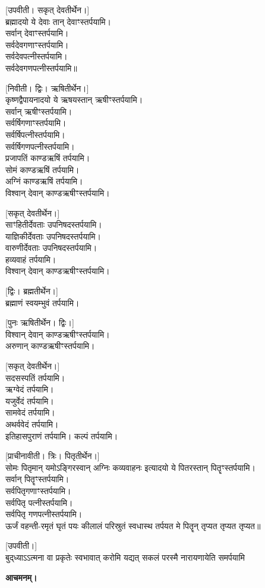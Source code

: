 \vspace{-1ex}
{\scriptsize [उपवीती। सकृत् देवतीर्थेन।]}\\
ब्रह्मादयो ये देवाः तान् देवाꣳस्तर्पयामि।\\
सर्वान् देवाꣳस्तर्पयामि।\\
सर्वदेवगणाꣳस्तर्पयामि।\\
सर्वदेवपत्नीस्तर्पयामि।\\
सर्वदेवगणपत्नीस्तर्पयामि॥

{\scriptsize [निवीती। द्विः। ऋषितीर्थेन।]}\\
कृष्णद्वैपायनादयो ये ऋषयस्तान् ऋषीꣳस्तर्पयामि।\\
सर्वान् ऋषीꣳस्तर्पयामि।\\
सर्वर्षिगणाꣳस्तर्पयामि।\\
सर्वर्षिपत्नीस्तर्पयामि।\\
सर्वर्षिगणपत्नीस्तर्पयामि।\\
प्रजापतिं काण्डऋषिं तर्पयामि।\\
सोमं काण्डऋषिं तर्पयामि।\\
अग्निं काण्डऋषिं तर्पयामि।\\
विश्वान् देवान् काण्डऋषीꣳस्तर्पयामि।
\pagebreak[4]

{\scriptsize [सकृत् देवतीर्थेन।]}\\
साꣳहितीर्देवताः उपनिषदस्तर्पयामि।\\
याज्ञिकीर्देवताः उपनिषदस्तर्पयामि।\\
वारुणीर्देवताः उपनिषदस्तर्पयामि।\\
हव्यवाहं तर्पयामि।\\
विश्वान् देवान् काण्डऋषीꣳस्तर्पयामि।

{\scriptsize [द्विः। ब्रह्मतीर्थेन।]}\\
ब्रह्माणं स्वयम्भुवं तर्पयामि।

{\scriptsize [पुनः ऋषितीर्थेन। द्विः।]}\\
विश्वान् देवान् काण्डऋषीꣳस्तर्पयामि।\\
अरुणान् काण्डऋषीꣳस्तर्पयामि।

{\scriptsize [सकृत् देवतीर्थेन।]}\\
सदसस्पतिं तर्पयामि।\\
ऋग्वेदं तर्पयामि।\\
यजुर्वेदं तर्पयामि।\\
सामवेदं तर्पयामि।\\
अथर्ववेदं तर्पयामि।\\
इतिहासपुराणं तर्पयामि। कल्पं तर्पयामि।

{\scriptsize [प्राचीनावीती। त्रिः। पितृतीर्थेन।]}\\
सोमः पितृमान् यमोऽङ्गिरस्वान् अग्निः कव्यवाहनः इत्यादयो ये पितरस्तान् पितॄꣳस्तर्पयामि।\\
सर्वान् पितॄꣳस्तर्पयामि।\\
सर्वपितृगणाꣳस्तर्पयामि।\\
सर्वपितृ पत्नीस्तर्पयामि।\\
सर्वपितृ गणपत्नीस्तर्पयामि।\\
ऊर्जं वहन्ती-रमृतं घृतं पयः कीलालं परिस्रुतं स्वधास्थ तर्पयत मे पितॄन् तृप्यत तृप्यत तृप्यत॥

{\scriptsize [उपवीती।]}\\
\vspace{-3ex}
{बुद्‌ध्याऽऽत्मना वा प्रकृतेः स्वभावात्}
{करोमि यद्यत् सकलं परस्मै}
{नारायणायेति समर्पयामि}

\textbf{आचमनम्।}

